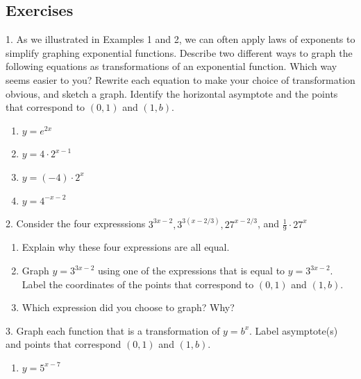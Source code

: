 \documentclass[10pt,]{book}
\theoremstyle{plain}
\theoremstyle{definition}
\theoremstyle{definition}
\theoremstyle{definition}
\numberwithin{equation}{section}
\begin{document}
\subsection[{Exercises}]{Exercises}\label{exercises-10}
\begin{exerciselist}
\item[1.]\hypertarget{exercise-62}{}\hypertarget{p-258}{}%
As we illustrated in Examples 1 and 2, we can often apply laws of exponents to simplify graphing exponential functions. Describe two different ways to graph the following equations as transformations of an exponential function.  Which way seems easier to you?  Rewrite each equation to make your choice of transformation obvious, and sketch a graph.  Identify the horizontal asymptote and the points that correspond to \((0,1)\) and \((1,b)\).%
\leavevmode%
\begin{enumerate}[label=(\alph*)]
\item\hypertarget{li-120}{}\(y=e^{2x}\)%
\item\hypertarget{li-121}{}\(y = 4 \cdot 2^{x-1}\)%
\item\hypertarget{li-122}{}\(y = (-4) \cdot 2^x\)%
\item\hypertarget{li-123}{}\(y = 4^{-x-2}\)%
\end{enumerate}
\par\smallskip
\item[2.]\hypertarget{exercise-63}{}\hypertarget{p-259}{}%
Consider the four expresssions \(3^{3x-2}, 3^{3(x-2/3)}, 27^{x-2/3}\), and \(\frac{1}{9} \cdot 27^x\)%
\leavevmode%
\begin{enumerate}[label=(\alph*)]
\item\hypertarget{li-124}{}Explain why these four expressions are all equal.%
\item\hypertarget{li-125}{}Graph \(y=3^{3x-2}\) using one of the expressions that is equal to \(y=3^{3x-2}\). Label the coordinates of the points that correspond to \((0, 1)\) and \((1, b)\).%
\item\hypertarget{li-126}{}Which expression did  you choose to graph?  Why?%
\end{enumerate}
\par\smallskip
\item[3.]\hypertarget{exercise-64}{}\hypertarget{p-260}{}%
Graph each function that is a transformation of \(y=b^x\). Label asymptote(s) and points that correspond \((0, 1)\) and \((1, b)\).%
\leavevmode%
\begin{enumerate}[label=(\alph*)]
\item\hypertarget{li-127}{}\(y=5^{x-7}\)%

\end{enumerate}
\end{exerciselist}
\end{document}
